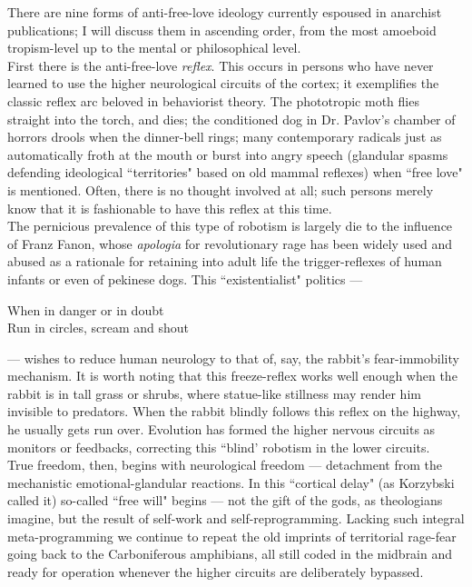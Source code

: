 There are nine forms of anti-free-love ideology currently espoused in anarchist publications; I will discuss them in ascending order, from the most amoeboid tropism-level up to the mental or philosophical level.\\
First there is the anti-free-love \emph{reflex}. This occurs in persons who have never learned to use the higher neurological circuits of the cortex; it exemplifies the classic reflex arc beloved in behaviorist theory. The phototropic moth flies straight into the torch, and dies; the conditioned dog in Dr. Pavlov's chamber of horrors drools when the dinner-bell rings; many contemporary radicals just as automatically froth at the mouth or burst into angry speech (glandular spasms defending ideological ``territories" based on old mammal reflexes) when ``free love" is mentioned. Often, there is no thought involved at all; such persons merely know that it is fashionable to have this reflex at this time.\\
The pernicious prevalence of this type of robotism is largely die to the influence of Franz Fanon, whose \emph{apologia} for revolutionary rage has been widely used and abused as a rationale for retaining into adult life the trigger-reflexes of human infants or even of pekinese dogs. This ``existentialist" politics ---
\begin{addmargin}{2cm}
When in danger or in doubt\\
Run in circles, scream and shout
\end{addmargin}
--- wishes to reduce human neurology to that of, say, the rabbit's fear-immobility mechanism. It is worth noting that this freeze-reflex works well enough when the rabbit is in tall grass or shrubs, where statue-like stillness may render him invisible to predators. When the rabbit blindly follows this reflex on the highway, he usually gets run over. Evolution has formed the higher nervous circuits as monitors or feedbacks, correcting this ``blind' robotism in the lower circuits.\\
True freedom, then, begins with neurological freedom --- detachment from the mechanistic emotional-glandular reactions. In this ``cortical delay" (as Korzybski called it) so-called ``free will" begins --- not the gift of the gods, as theologians imagine, but the result of self-work and self-reprogramming. Lacking such integral meta-programming we continue to repeat the old imprints of territorial rage-fear going back to the Carboniferous amphibians, all still coded in the midbrain and ready for operation whenever the higher circuits are deliberately bypassed.\\
